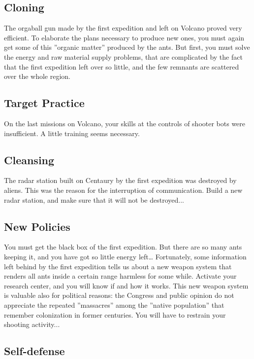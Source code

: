 \subsection{Cloning}

The orgaball gun made by the first expedition and left on Volcano proved very efficient. To elaborate the plans necessary to produce new ones, you must again get some of this ''organic matter'' produced by the ants. But first, you must solve the energy and raw material supply problems, that are complicated by the fact that the first expedition left over so little, and the few remnants are scattered over the whole region.


\subsection{Target Practice}

On the last missions on Volcano, your skills at the controls of shooter bots were insufficient. A little training seems necessary.


\subsection{Cleansing}

The radar station built on Centaury by the first expedition was destroyed by aliens. This was the reason for the interruption of communication. Build a new radar station, and make sure that it will not be destroyed...


\subsection{New Policies}

You must get the black box of the first expedition. But there are so many ants keeping it, and you have got so little energy left… Fortunately, some information left behind by the first expedition tells us about a new weapon system that renders all ants inside a certain range harmless for some while. Activate your research center, and you will know if and how it works. This new weapon system is valuable also for political reasons: the Congress and public opinion do not appreciate the repeated ''massacres'' among the ''native population'' that remember colonization in former centuries. You will have to restrain your shooting activity...


\subsection{Self-defense}

